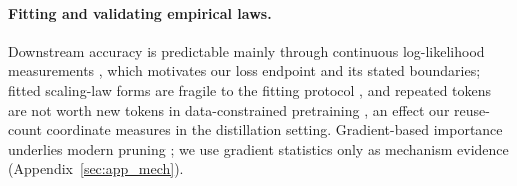 \paragraph{Fitting and validating empirical laws.} Downstream accuracy
is predictable mainly through continuous log-likelihood measurements
\citep{schaeffer2023emergent,schaeffer2024predicting,gadre2024language,bhagia2024establishing,lourie2025scaling},
which motivates our loss endpoint and its stated boundaries; fitted
scaling-law forms are fragile to the fitting protocol
\citep{li2025misfitting,besiroglu2024chinchilla}, and repeated tokens
are not worth new tokens in data-constrained pretraining
\citep{muennighoff2023scaling}, an effect our reuse-count coordinate
measures in the distillation setting. Gradient-based importance
underlies modern pruning
\citep{lecun1989optimal,frantar2023sparsegpt,sun2023simple}; we use
gradient statistics only as mechanism evidence
(Appendix~\ref{sec:app_mech}).
